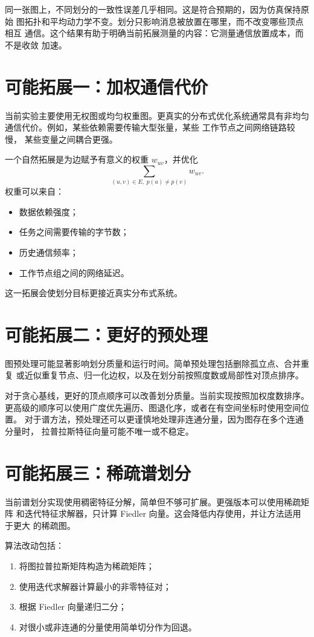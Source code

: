 \documentclass[UTF8, 11pt]{ctexart}
\begin{document}
同一张图上，不同划分的一致性误差几乎相同。这是符合预期的，因为仿真保持原始
图拓扑和平均动力学不变。划分只影响消息被放置在哪里，而不改变哪些顶点相互
通信。这个结果有助于明确当前拓展测量的内容：它测量通信放置成本，而不是收敛
加速。

\section{可能拓展一：加权通信代价}

当前实验主要使用无权图或均匀权重图。更真实的分布式优化系统通常具有非均匀
通信代价。例如，某些依赖需要传输大型张量，某些 工作节点之间网络链路较慢，
某些变量之间耦合更强。

一个自然拓展是为边赋予有意义的权重 $w_{uv}$，并优化
\[
    \sum_{(u,v)\in E,\;p(u)\neq p(v)} w_{uv}.
\]
权重可以来自：
\begin{itemize}
    \item 数据依赖强度；
    \item 任务之间需要传输的字节数；
    \item 历史通信频率；
    \item 工作节点组之间的网络延迟。
\end{itemize}
这一拓展会使划分目标更接近真实分布式系统。

\section{可能拓展二：更好的预处理}

图预处理可能显著影响划分质量和运行时间。简单预处理包括删除孤立点、合并重复
或近似重复节点、归一化边权，以及在划分前按照度数或局部性对顶点排序。

对于贪心基线，更好的顶点顺序可以改善划分质量。当前实现按照加权度数排序。
更高级的顺序可以使用广度优先遍历、图退化序，或者在有空间坐标时使用空间位置。
对于谱方法，预处理还可以更谨慎地处理非连通分量，因为图存在多个连通分量时，
拉普拉斯特征向量可能不唯一或不稳定。

\section{可能拓展三：稀疏谱划分}

当前谱划分实现使用稠密特征分解，简单但不够可扩展。更强版本可以使用稀疏矩阵
和迭代特征求解器，只计算 Fiedler 向量。这会降低内存使用，并让方法适用于更大
的稀疏图。

算法改动包括：
\begin{enumerate}
    \item 将图拉普拉斯矩阵构造为稀疏矩阵；
    \item 使用迭代求解器计算最小的非零特征对；
    \item 根据 Fiedler 向量递归二分；
    \item 对很小或非连通的分量使用简单切分作为回退。
\end{enumerate}
\end{document}
